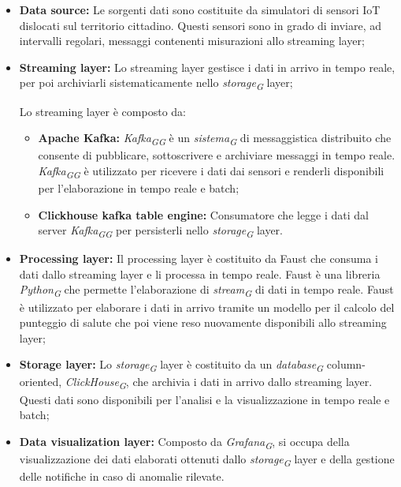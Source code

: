 \begin{itemize}
    \item \textbf{Data source:} Le sorgenti dati sono costituite da simulatori di sensori IoT dislocati sul territorio cittadino. Questi sensori sono in grado di inviare, ad intervalli regolari, messaggi contenenti misurazioni allo streaming layer;
    
    \item \textbf{Streaming layer:} Lo streaming layer gestisce i dati in arrivo in tempo reale, per poi archiviarli sistematicamente nello \textit{storage}\textsubscript{\textit{G}} layer;
    
    Lo streaming layer è composto da:
    \begin{itemize}
        \item \textbf{Apache Kafka:} \textit{Kafka}\textsubscript{\textit{G}}\textsubscript{\textit{G}} è un \textit{sistema}\textsubscript{\textit{G}} di messaggistica distribuito che consente di pubblicare, sottoscrivere e archiviare messaggi in tempo reale. \textit{Kafka}\textsubscript{\textit{G}}\textsubscript{\textit{G}} è utilizzato per ricevere i dati dai sensori e renderli disponibili per l'elaborazione in tempo reale e batch;
        
        \item \textbf{Clickhouse kafka table engine:} Consumatore che legge i dati dal server \textit{Kafka}\textsubscript{\textit{G}}\textsubscript{\textit{G}} per persisterli nello \textit{storage}\textsubscript{\textit{G}} layer.
    \end{itemize}

    \item \textbf{Processing layer:} Il processing layer è costituito da Faust che consuma i dati dallo streaming layer e li processa in tempo reale. Faust è una libreria \textit{Python}\textsubscript{\textit{G}} che permette l'elaborazione di \textit{stream}\textsubscript{\textit{G}} di dati in tempo reale. Faust è utilizzato per elaborare i dati in arrivo tramite un modello per il calcolo del punteggio di salute che poi viene reso nuovamente disponibili allo streaming layer;
    
    \item \textbf{Storage layer:} Lo \textit{storage}\textsubscript{\textit{G}} layer è costituito da un \textit{database}\textsubscript{\textit{G}} column-oriented, \textit{ClickHouse}\textsubscript{\textit{G}}, che archivia i dati in arrivo dallo streaming layer. Questi dati sono disponibili per l'analisi e la visualizzazione in tempo reale e batch;
    
    \item \textbf{Data visualization layer:} Composto da \textit{Grafana}\textsubscript{\textit{G}}, si occupa della visualizzazione dei dati elaborati ottenuti dallo \textit{storage}\textsubscript{\textit{G}} layer e della gestione delle notifiche in caso di anomalie rilevate.
\end{itemize}